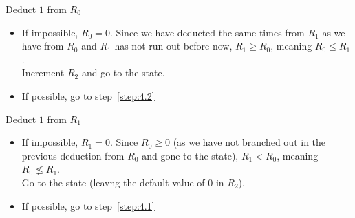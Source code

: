 \begin{problem}
\begin{answer}
    \begin{enumarabic}
      \item {}
      \item Deduct $1$ from $R_0$~\label{step:4.1}
        \begin{itemize}
          \item If impossible, $R_0 = 0$. Since we have deducted the same times
            from $R_1$ as we have from $R_0$ and $R_1$ has not run out before now,
            $R_1 \geq R_0$, meaning $R_0 \leq R_1$. \\
            Increment $R_2$ and go to the  state.
          \item If possible, go to step~\ref{step:4.2}
        \end{itemize}
      \item Deduct $1$ from $R_1$~\label{step:4.2}
        \begin{itemize}
          \item If impossible, $R_1 = 0$. Since $R_0 \geq 0$ (as we have not branched out in the previous
            deduction from $R_0$ and gone to the  state), $R_1 < R_0$, meaning $R_0 \nleq R_1$. \\
            Go to the  state (leavng the default value of $0$ in $R_2$).
          \item If possible, go to step~\ref{step:4.1}
        \end{itemize}
    \end{enumarabic}

  \end{answer}
\end{problem}
